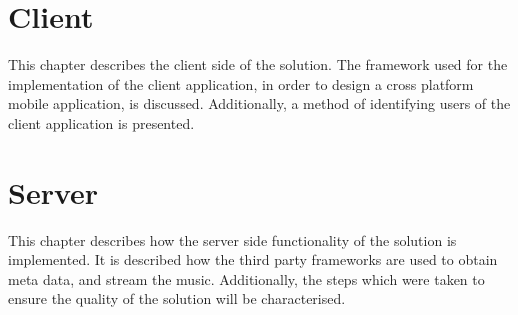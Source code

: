 



\chapter{Client}

This chapter describes the client side of the solution. The framework
used for the implementation of the client application, in order to
design a cross platform mobile application, is
discussed. Additionally, a method of identifying users of the
client application is presented.



\chapter{Server}

This chapter describes how the server side functionality of the solution is implemented. It is described how the third party frameworks are used to obtain meta data, and stream the music. Additionally, the steps which were taken to ensure the quality of the solution will be characterised.














